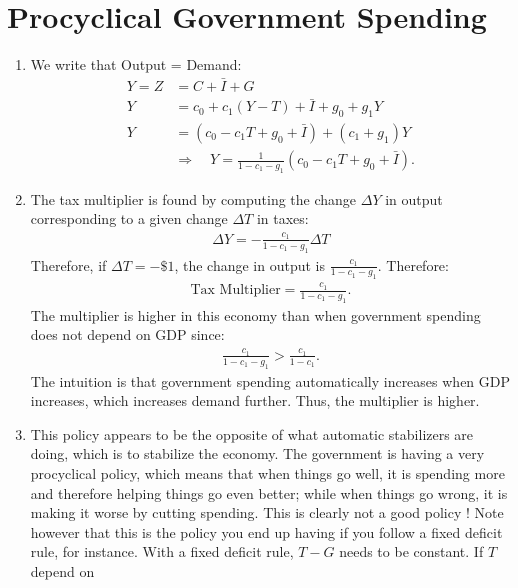 \documentclass[]{book}
\begin{document}
\section{Procyclical Government
Spending}\label{procyclical-government-spending-1}

\begin{enumerate}
\def\labelenumi{\arabic{enumi}.}
\item
  We write that Output = Demand: \[
  \begin{aligned}
  Y=Z &=C+\bar{I}+G\\
  Y   &=c_{0}+c_{1}\left(Y-T\right)+ \bar{I} + g_{0}+g_{1}Y\\
  Y   &=\left(c_{0}-c_{1}T+g_{0}+\bar{I}\right)+\left(c_{1}+g_{1}\right)Y \\
  & \Rightarrow \quad \boxed{Y=\frac{1}{1-c_{1}-g_{1}}\left(c_{0}-c_{1}T+g_{0}+\bar{I}\right)}.
  \end{aligned}
  \]
\item
  The tax multiplier is found by computing the change \(\Delta Y\) in
  output corresponding to a given change \(\Delta T\) in taxes: \[
  \begin{aligned}
  \Delta Y = -\frac{c_1}{1-c_1-g_1}\Delta T
  \end{aligned}
  \] Therefore, if \(\Delta T = -\$ 1\), the change in output is
  \(\frac{c_1}{1-c_1-g_1}\). Therefore: \[
  \begin{aligned}
  \boxed{\text{Tax Multiplier} = \frac{c_1}{1-c_1-g_1}}.
  \end{aligned}
  \] The multiplier is higher in this economy than when government
  spending does not depend on GDP since: \[
  \begin{aligned}
  \frac{c_1}{1-c_1-g_1}>\frac{c_1}{1-c_1}.
  \end{aligned}
  \] The intuition is that government spending automatically increases
  when GDP increases, which increases demand further. Thus, the
  multiplier is higher.
\item
  This policy appears to be the opposite of what automatic stabilizers
  are doing, which is to stabilize the economy. The government is having
  a very procyclical policy, which means that when things go well, it is
  spending more and therefore helping things go even better; while when
  things go wrong, it is making it worse by cutting spending. This is
  clearly not a good policy ! Note however that this is the policy you
  end up having if you follow a fixed deficit rule, for instance. With a
  fixed deficit rule, \(T-G\) needs to be constant. If \(T\) depend on

\end{enumerate}
\end{document}
